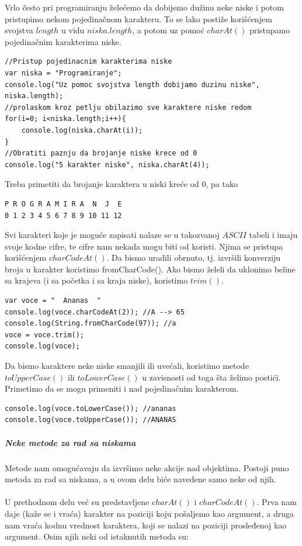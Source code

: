\documentclass[a4paper]{article}
\begin{document}
Vrlo često pri programiranju želećemo da dobijemo dužinu neke niske i potom pristupimo nekom pojedinačnom karakteru. To se lako postiže korišćenjem svojstva $length$ u vidu $niska.length$, a potom uz pomoć $charAt()$ pristupamo pojedinačnim karakterima niske.
\begin{verbatim}
//Pristup pojedinacnim karakterima niske
var niska = "Programiranje";
console.log("Uz pomoc svojstva length dobijamo duzinu niske", niska.length);
//prolaskom kroz petlju obilazimo sve karaktere niske redom
for(i=0; i<niska.length;i++){
    console.log(niska.charAt(i));	
}
//Obratiti paznju da brojanje niske krece od 0
console.log("5 karakter niske", niska.charAt(4));
\end{verbatim}
Treba primetiti da brojanje karaktera u niski kreće od 0, pa tako 
\begin{verbatim}
P R O G R A M I R A  N  J  E
0 1 2 3 4 5 6 7 8 9 10 11 12
\end{verbatim}
Svi karakteri koje je moguće zapisati nalaze se u takozvanoj $ASCII$ tabeli i imaju svoje kodne cifre, te cifre nam nekada mogu biti od koristi. Njima se pristupa korišćenjem $charCodeAt()$. Da bismo uradili obrnuto, tj. izvršili konverziju broja u karakter koristimo fromCharCode(). Ako bismo želeli da uklonimo beline sa krajeva (i sa početka i sa kraja niske), koristimo $trim()$. 
\begin{verbatim}
var voce = "  Ananas  "
console.log(voce.charCodeAt(2)); //A --> 65
console.log(String.fromCharCode(97)); //a
voce = voce.trim();
console.log(voce);     
\end{verbatim}
Da bismo karaktere neke niske smanjili ili uvećali, koristimo metode $toUpperCase()$ ili $toLowerCase()$ u zavisnosti od toga šta želimo postići. Primetimo da se mogu primeniti i nad pojedinačnim karakterom.
\begin{verbatim}
console.log(voce.toLowerCase()); //ananas
console.log(voce.toUpperCase()); //ANANAS
\end{verbatim}
\subparagraph{Neke metode za rad sa niskama}
Metode nam omogućavaju da izvršimo neke akcije nad objektima. Postoji puno metoda za rad sa niskama, a u ovom delu biće navedene samo neke od njih. \\\\
U prethodnom delu već su predstavljene $charAt()$ i $charCodeAt()$. Prva nam daje (kaže se i vraća) karakter na poziciji koju pošaljemo kao argument, a druga nam vraća kodnu vrednost karaktera, koji se nalazi na poziciji prosleđenoj kao argument. Osim njih neki od istaknutih metoda su:
\end{document}
